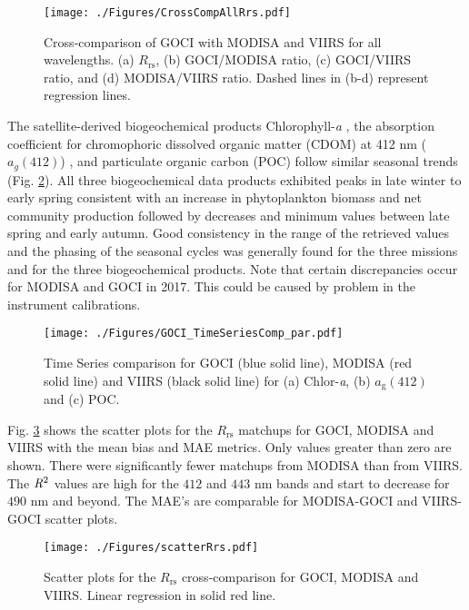 \documentclass[]{interact}
\theoremstyle{plain}%
\theoremstyle{definition}
\theoremstyle{remark}
\begin{document}
\begin{figure}[H]
  \centering
  \texttt{[image: ./Figures/CrossCompAllRrs.pdf]}
    \caption{Cross-comparison of GOCI with MODISA and VIIRS for all wavelengths. (a) $R_\text{rs}$, (b) GOCI/MODISA ratio, (c) GOCI/VIIRS ratio, and (d) MODISA/VIIRS ratio. Dashed lines in (b-d) represent regression lines. \label{fig:CrossCompAllRrs} } 
\end{figure}
The satellite-derived biogeochemical products Chlorophyll-{\it a} \citep{OReilly1998_Chl}, the absorption coefficient for chromophoric dissolved organic matter (CDOM) at 412 nm  ($a_g(412)$) \citep{Mannino2014}, and particulate organic carbon (POC) \citep{Stramski2008} follow similar seasonal trends (Fig. \ref{fig:GOCI_TimeSeriesComp_par}). All three biogeochemical data products exhibited peaks in late winter to early spring consistent with an increase in phytoplankton biomass and net community production followed by decreases and minimum values between late spring and early autumn. Good consistency in the range of the retrieved values and the phasing of the seasonal cycles was generally found for the three missions and for the three biogeochemical products. Note that certain discrepancies occur for MODISA and GOCI in 2017. This could be caused by problem in the instrument calibrations.


\begin{figure}[H]
  \centering
  \texttt{[image: ./Figures/GOCI\_TimeSeriesComp\_par.pdf]}
    \caption{Time Series comparison for GOCI (blue solid line), MODISA (red solid line) and VIIRS (black solid line) for (a) Chlor-{\it a}, (b) $a_\text{g}(412)$ and (c) POC. \label{fig:GOCI_TimeSeriesComp_par}} 
\end{figure}
Fig. \ref{fig:scatterRrs} shows the scatter plots for the $R_\text{rs}$ matchups for GOCI, MODISA and VIIRS with the mean bias and MAE metrics. Only values greater than zero are shown. There were significantly fewer matchups from MODISA than from VIIRS. The ${\it R}^2$ values are high for the $412$ and $443$ nm bands and start to decrease for $490$ nm and beyond. The MAE's are comparable for MODISA-GOCI and VIIRS-GOCI scatter plots.
\begin{figure}[H]
  \centering
  \texttt{[image: ./Figures/scatterRrs.pdf]}
    \caption{Scatter plots for the $R_\text{rs}$ cross-comparison for GOCI, MODISA and VIIRS. Linear regression in solid red line. \label{fig:scatterRrs}} 
\end{figure}
\end{document}
